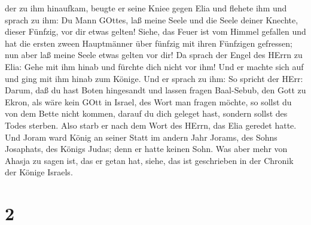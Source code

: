 der zu ihm hinaufkam, beugte er seine Kniee gegen Elia und flehete ihm
und sprach zu ihm: Du Mann GOttes, laß meine Seele und die Seele deiner
Knechte, dieser Fünfzig, vor dir etwas gelten!  Siehe, das
Feuer ist vom Himmel gefallen und hat die ersten zween Hauptmänner über
fünfzig mit ihren Fünfzigen gefressen; nun aber laß meine Seele etwas
gelten vor dir!  Da sprach der Engel des HErrn zu Elia:
Gehe mit ihm hinab und fürchte dich nicht vor ihm! Und er machte sich
auf und ging mit ihm hinab zum Könige.  Und er sprach zu
ihm: So spricht der HErr: Darum, daß du hast Boten hingesandt und lassen
fragen Baal-Sebub, den Gott zu Ekron, als wäre kein GOtt in Israel, des
Wort man fragen möchte, so sollst du von dem Bette nicht kommen, darauf
du dich geleget hast, sondern sollst des Todes sterben. 
Also starb er nach dem Wort des HErrn, das Elia geredet hatte. Und Joram
ward König an seiner Statt im andern Jahr Jorams, des Sohns Josaphats,
des Königs Judas; denn er hatte keinen Sohn.  Was aber mehr
von Ahasja zu sagen ist, das er getan hat, siehe, das ist geschrieben in
der Chronik der Könige Israels.

\hypertarget{section-1}{%
\section{2}\label{section-1}}

